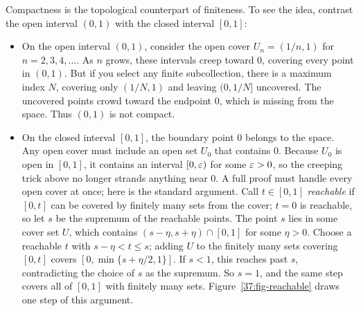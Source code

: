 Compactness is the topological counterpart of finiteness. To see the idea, contrast the open interval $(0, 1)$ with the closed interval $[0, 1]$:
\begin{itemize}
  \item On the open interval $(0, 1)$, consider the open cover $U_n = (1/n, 1)$ for $n = 2, 3, 4, \dots$. As $n$ grows, these intervals creep toward $0$, covering every point in $(0, 1)$. But if you select any finite subcollection, there is a maximum index $N$, covering only $(1/N, 1)$ and leaving $(0, 1/N]$ uncovered. The uncovered points crowd toward the endpoint $0$, which is missing from the space. Thus $(0, 1)$ is not compact.
  \item On the closed interval $[0, 1]$, the boundary point $0$ belongs to the space. Any open cover must include an open set $U_0$ that contains $0$. Because $U_0$ is open in $[0, 1]$, it contains an interval $[0, \varepsilon)$ for some $\varepsilon > 0$, so the creeping trick above no longer strands anything near $0$. A full proof must handle every open cover at once; here is the standard argument. Call $t \in [0, 1]$ \emph{reachable} if $[0, t]$ can be covered by finitely many sets from the cover; $t = 0$ is reachable, so let $s$ be the supremum of the reachable points. The point $s$ lies in some cover set $U$, which contains $(s - \eta, s + \eta) \cap [0, 1]$ for some $\eta > 0$. Choose a reachable $t$ with $s - \eta < t \le s$; adding $U$ to the finitely many sets covering $[0, t]$ covers $[0, \min\{s + \eta/2, 1\}]$. If $s < 1$, this reaches past $s$, contradicting the choice of $s$ as the supremum. So $s = 1$, and the same step covers all of $[0, 1]$ with finitely many sets. Figure~\ref{37:fig-reachable} draws one step of this argument.
\end{itemize}

